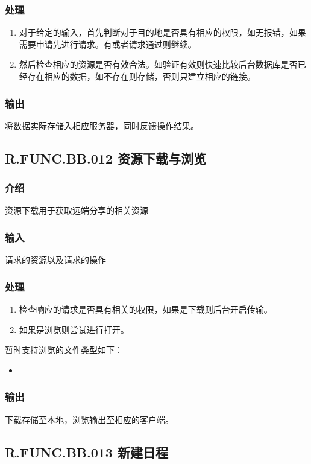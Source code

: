 \begin{enumerate}
    \subsubsection{处理}
    \begin{enumerate}
      \item 对于给定的输入，首先判断对于目的地是否具有相应的权限，如无报错，如果需要申请先进行请求。有或者请求通过则继续。
      \item 然后检查相应的资源是否有效合法。如验证有效则快速比较后台数据库是否已经存在相应的数据，如不存在则存储，否则只建立相应的链接。
    \end{enumerate}
    \subsubsection{输出}
    将数据实际存储入相应服务器，同时反馈操作结果。

  \subsection{R.FUNC.BB.012 资源下载与浏览}
    \subsubsection{介绍}
    资源下载用于获取远端分享的相关资源
    \subsubsection{输入}
    请求的资源以及请求的操作
    \subsubsection{处理}
    \begin{enumerate}
      \item 检查响应的请求是否具有相关的权限，如果是下载则后台开启传输。
      \item 如果是浏览则尝试进行打开。
    \end{enumerate}
    暂时支持浏览的文件类型如下：
    \begin{itemize}
      \item
    \end{itemize}
    \subsubsection{输出}
    下载存储至本地，浏览输出至相应的客户端。

  \subsection{R.FUNC.BB.013 新建日程}

\end{enumerate}
